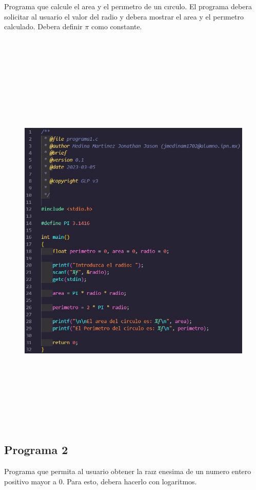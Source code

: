 \documentclass{article}
\begin{document}
Programa que calcule el area y el perımetro de un cırculo. El programa debera solicitar al usuario el valor del radio y debera mostrar el area y el perımetro calculado. Debera definir $\pi$ como constante.

\

\begin{figure}[H]
    \centering
    \includegraphics[height = 19cm]{img1.jpg}
\end{figure}

\subsection{Programa 2}

Programa que permita al usuario obtener la raız enesima de un numero entero positivo mayor a 0. Para esto, debera hacerlo con logaritmos.
\end{document}

